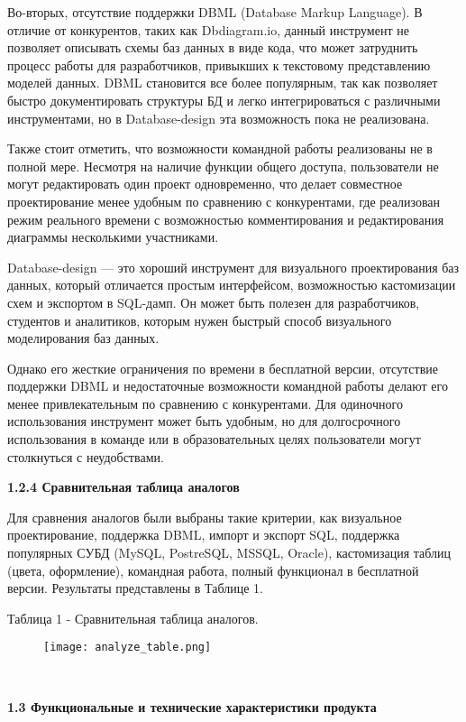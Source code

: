 Во-вторых, отсутствие поддержки DBML (Database Markup Language). В отличие от конкурентов, таких как Dbdiagram.io, данный инструмент не позволяет описывать схемы баз данных в виде кода, что может затруднить процесс работы для разработчиков, привыкших к текстовому представлению моделей данных. DBML становится все более популярным, так как позволяет быстро документировать структуры БД и легко интегрироваться с различными инструментами, но в Database-design эта возможность пока не реализована.

Также стоит отметить, что возможности командной работы реализованы не в полной мере. Несмотря на наличие функции общего доступа, пользователи не могут редактировать один проект одновременно, что делает совместное проектирование менее удобным по сравнению с конкурентами, где реализован режим реального времени с возможностью комментирования и редактирования диаграммы несколькими участниками.

Database-design — это хороший инструмент для визуального проектирования баз данных, который отличается простым интерфейсом, возможностью кастомизации схем и экспортом в SQL-дамп. Он может быть полезен для разработчиков, студентов и аналитиков, которым нужен быстрый способ визуального моделирования баз данных.

Однако его жесткие ограничения по времени в бесплатной версии, отсутствие поддержки DBML и недостаточные возможности командной работы делают его менее привлекательным по сравнению с конкурентами. Для одиночного использования инструмент может быть удобным, но для долгосрочного использования в команде или в образовательных целях пользователи могут столкнуться с неудобствами.

\textbf{1.2.4 Сравнительная таблица аналогов}

Для сравнения аналогов были выбраны такие критерии, как визуальное проектирование, поддержка DBML, импорт и экспорт SQL, поддержка популярных СУБД (MySQL, PostreSQL, MSSQL, Oracle), кастомизация таблиц (цвета, оформление), командная работа, полный функционал в бесплатной версии. Результаты представлены в Таблице 1.

\newpage
Таблица 1 - Сравнительная таблица аналогов.
\begin{figure}[htbp]
    \centering 
    \texttt{[image: analyze\_table.png]} 
\end{figure}

\

\textbf{1.3 Функциональные и технические характеристики продукта}

